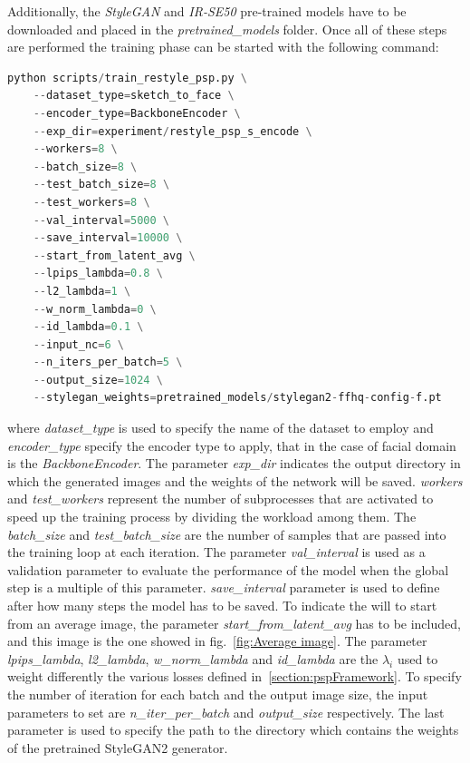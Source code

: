  Additionally, the \textit{StyleGAN} and \textit{IR-SE50} pre-trained models have to be downloaded and placed in the \textit{pretrained\_models} folder.
 Once all of these steps are performed the training phase can be started with the following command:
 \begin{lstlisting}[language=Python, numbers=none]
    python scripts/train_restyle_psp.py \
    --dataset_type=sketch_to_face \
    --encoder_type=BackboneEncoder \
    --exp_dir=experiment/restyle_psp_s_encode \
    --workers=8 \
    --batch_size=8 \
    --test_batch_size=8 \
    --test_workers=8 \
    --val_interval=5000 \
    --save_interval=10000 \
    --start_from_latent_avg \
    --lpips_lambda=0.8 \
    --l2_lambda=1 \
    --w_norm_lambda=0 \
    --id_lambda=0.1 \
    --input_nc=6 \
    --n_iters_per_batch=5 \
    --output_size=1024 \
    --stylegan_weights=pretrained_models/stylegan2-ffhq-config-f.pt
 \end{lstlisting}
where \textit{dataset\_type} is used to specify the name of the dataset to employ and  \textit{encoder\_type} specify the encoder type to apply, that in the case of facial domain is the \textit{BackboneEncoder}. The parameter \textit{exp\_dir} indicates the output directory in which the generated images and the weights of the network will be saved. \textit{workers} and \textit{test\_workers} represent the number of subprocesses that are activated to speed up the training process by dividing the workload among them. The \textit{batch\_size} and \textit{test\_batch\_size} are the number of samples that are passed into the training loop at each iteration. The parameter \textit{val\_interval} is used as a validation parameter to evaluate the performance of the model when the global step is a multiple of this parameter. \textit{save\_interval} parameter is used to define after how many steps the model has to be saved. To indicate the will to start from an average image, the parameter \textit{start\_from\_latent\_avg} has to be included, and this image is the one showed in fig.~\ref{fig:Average image}. The parameter \textit{lpips\_lambda}, \textit{l2\_lambda}, \textit{w\_norm\_lambda} and \textit{id\_lambda} are the $\lambda_i$ used to weight differently the various losses defined in~\ref{section:pspFramework}.
To specify the number of iteration for each batch and the output image size, the input parameters to set are \textit{n\_iter\_per\_batch} and \textit{output\_size} respectively. The last parameter is used to specify the path to the directory which contains the weights of the pretrained StyleGAN2 generator.\\
